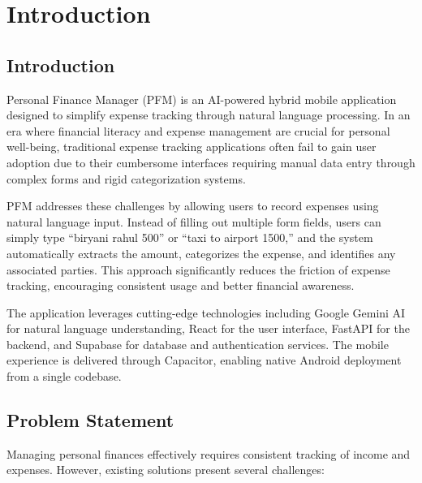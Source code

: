 
\chapter{Introduction}

\section{Introduction}

Personal Finance Manager (PFM) is an AI-powered hybrid mobile application designed to simplify expense tracking through natural language processing. In an era where financial literacy and expense management are crucial for personal well-being, traditional expense tracking applications often fail to gain user adoption due to their cumbersome interfaces requiring manual data entry through complex forms and rigid categorization systems.

PFM addresses these challenges by allowing users to record expenses using natural language input. Instead of filling out multiple form fields, users can simply type ``biryani rahul 500'' or ``taxi to airport 1500,'' and the system automatically extracts the amount, categorizes the expense, and identifies any associated parties. This approach significantly reduces the friction of expense tracking, encouraging consistent usage and better financial awareness.

The application leverages cutting-edge technologies including Google Gemini AI for natural language understanding, React for the user interface, FastAPI for the backend, and Supabase for database and authentication services. The mobile experience is delivered through Capacitor, enabling native Android deployment from a single codebase.

\section{Problem Statement}

Managing personal finances effectively requires consistent tracking of income and expenses. However, existing solutions present several challenges:

